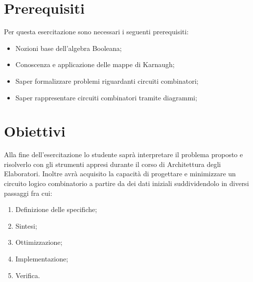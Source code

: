 \section{Prerequisiti}
Per questa esercitazione sono necessari i seguenti prerequisiti:

\begin{itemize}
    \item Nozioni base dell'algebra Booleana;
    \item Conoscenza e applicazione delle mappe di Karnaugh;
    \item Saper formalizzare problemi riguardanti circuiti combinatori;
    \item Saper rappresentare circuiti combinatori tramite diagrammi;
\end{itemize}

\section{Obiettivi}
Alla fine dell'esercitazione lo studente saprà interpretare il problema proposto e risolverlo con gli strumenti appresi durante il corso di Architettura degli Elaboratori. Inoltre avrà acquisito la capacità di progettare e minimizzare un circuito logico combinatorio a partire da dei dati iniziali suddividendolo in diversi passaggi fra cui:
\begin{enumerate}
    \item Definizione delle specifiche;
    \item Sintesi;
    \item Ottimizzazione;
    \item Implementazione;
    \item Verifica.
\end{enumerate}